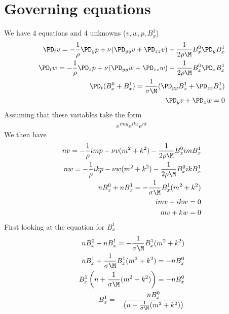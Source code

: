 \documentclass[11pt]{article}
\begin{document}
\section{Governing equations}
We have 4 equations and 4 unknowns ($v,w,p,B_x^1$)
\begin{equation}\begin{aligned}
\PD_t v = -\frac{1}{\rho} \PD_y p + \nu (\PD_{yy} v+\PD_{zz} v) - \frac{1}{2\rho \M} B_x^0 \PD_y B_x^1 \\
\PD_t w = -\frac{1}{\rho} \PD_z p + \nu (\PD_{yy} w+\PD_{zz} w) - \frac{1}{2\rho \M} B_x^0 \PD_z B_x^1 \\
\PD_t (B_x^0+B_x^1) = \frac{1}{\sigma \M} (\PD_{yy} B_x^1+\PD_{zz} B_x^1) \\
\PD_y v + \PD_z w = 0 \\
\end{aligned} \end{equation}
Assuming that these variables take the form
\begin{equation}\begin{aligned}
e^{imy} e^{ikz} e^{nt}
\end{aligned} \end{equation}
We then have
\begin{equation}\begin{aligned}
n v = -\frac{1}{\rho} im p - \nu v (m^2+k^2) - \frac{1}{2\rho \M} B_x^0 im B_x^1 \\
n w = -\frac{1}{\rho} ik p - \nu w (m^2+k^2) - \frac{1}{2\rho \M} B_x^0 ik B_x^1 \\
n B_x^0+ n B_x^1 = - \frac{1}{\sigma \M} B_x^1 (m^2 +k^2 ) \\
im v + ik w = 0 \\
m v + k w = 0 \\
\end{aligned} \end{equation}
First looking at the equation for $B_x^1$
\begin{equation}\begin{aligned}
n B_x^0+ n B_x^1 = - \frac{1}{\sigma \M} B_x^1 (m^2 +k^2 ) \\
n B_x^1 + \frac{1}{\sigma \M} B_x^1 (m^2 +k^2 ) = - n B_x^0 \\
B_x^1 \left( n + \frac{1}{\sigma \M} (m^2 +k^2 ) \right) = - n B_x^0 \\
B_x^1 = - \frac{n B_x^0}{\left( n + \frac{1}{\sigma \M} (m^2 +k^2 ) \right)} \\
\end{aligned} \end{equation}
\end{document}
